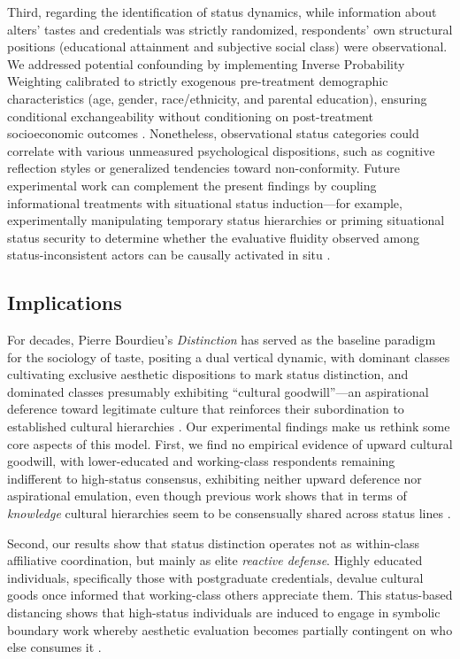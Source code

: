 \documentclass[12pt, letterpaper]{article}
\begin{document}
Third, regarding the identification of status dynamics, while information about alters' tastes and credentials was strictly randomized, respondents' own structural positions (educational attainment and subjective social class) were observational. We addressed potential confounding by implementing Inverse Probability Weighting calibrated to strictly exogenous pre-treatment demographic characteristics (age, gender, race/ethnicity, and parental education), ensuring conditional exchangeability without conditioning on post-treatment socioeconomic outcomes \citep{ brand2013causal}. Nonetheless, observational status categories could correlate with various unmeasured psychological dispositions, such as cognitive reflection styles or generalized tendencies toward non-conformity. Future experimental work can complement the present findings by coupling informational treatments with situational status induction---for example, experimentally manipulating temporary status hierarchies or priming situational status security to determine whether the evaluative fluidity observed among status-inconsistent actors can be causally activated in situ \citep{correll2007getting}.

\subsection{Implications}

For decades, Pierre Bourdieu's \textit{Distinction} \citep{bourdieu1984} has served as the baseline paradigm for the sociology of taste, positing a dual vertical dynamic, with dominant classes cultivating exclusive aesthetic dispositions to mark status distinction, and dominated classes presumably exhibiting ``cultural goodwill''---an aspirational deference toward legitimate culture that reinforces their subordination to established cultural hierarchies \citep{jæger2024from-a4b}. Our experimental findings make us rethink some core aspects of this model. First, we find no empirical evidence of upward cultural goodwill, with lower-educated and working-class respondents remaining indifferent to high-status consensus, exhibiting neither upward deference nor aspirational emulation, even though previous work shows that in terms of \textit{knowledge} cultural hierarchies seem to be consensually shared across status lines \citep{jæger2023what-0c6}. 

Second, our results show that status distinction operates not as within-class affiliative coordination, but mainly as elite \textit{reactive defense}. Highly educated individuals, specifically those with postgraduate credentials, devalue cultural goods once informed that working-class others appreciate them. This status-based distancing shows that high-status individuals are induced to engage in symbolic boundary work whereby aesthetic evaluation becomes partially contingent on who else consumes it \citep{simmel1957, berger2008}. 
\end{document}
